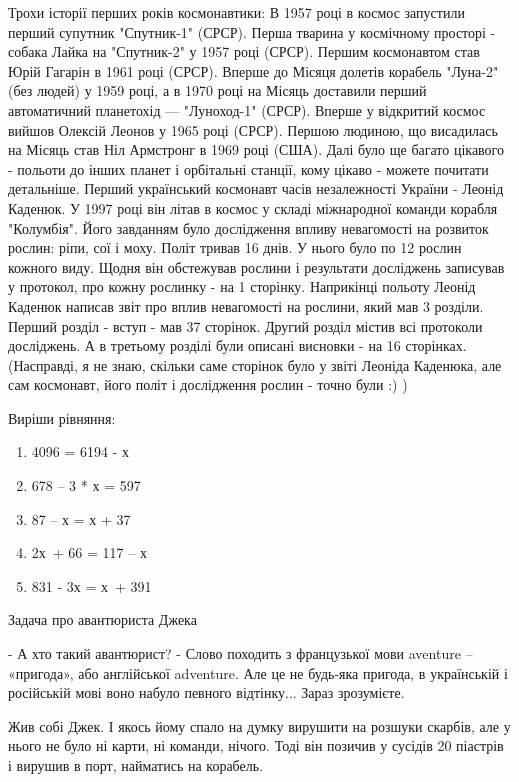 Трохи історії перших років космонавтики:
В 1957 році в космос запустили перший супутник "Спутник-1" (СРСР).
Перша тварина у космічному просторі - собака Лайка на "Спутник-2"
у 1957 році (СРСР).
Першим космонавтом став Юрій Гагарін в 1961 році (СРСР).
Вперше до Місяця долетів корабель "Луна-2" (без людей) у 1959 році,
а в 1970 році на Місяць доставили перший автоматичний планетохід —
"Луноход-1" (СРСР).
Вперше у відкритий космос вийшов Олексій Леонов у 1965 році (СРСР).
Першою людиною, що висадилась на Місяць став Ніл Армстронг в 1969 році (США).
Далі було ще багато цікавого - польоти до інших планет і орбітальні станції,
кому цікаво - можете почитати детальніше.
Перший український космонавт часів незалежності України - Леонід Каденюк.
У 1997 році він літав в космос у складі міжнародної команди корабля "Колумбія".
Його завданням було дослідження впливу невагомості на розвиток рослин:
ріпи, сої і моху. Політ тривав 16 днів. У нього було по 12 рослин кожного виду.
Щодня він обстежував рослини і результати досліджень записував у протокол,
про кожну рослинку - на 1 сторінку. Наприкінці польоту Леонід Каденюк
написав звіт про вплив невагомості на рослини, який мав 3 розділи.
Перший розділ - вступ - мав 37 сторінок. Другий розділ містив всі
протоколи досліджень. А в третьому розділі були описані висновки -
на 16 сторінках.
(Насправді, я не знаю, скільки саме сторінок було у звіті Леоніда Каденюка,
але сам космонавт, його політ і дослідження рослин - точно були :) )


\problem
Виріши рівняння:
\begin{multicols}{2}
    \begin{enumerate}
        \item 4096 = 6194 - х
        \item 678 – 3 * х = 597
        \item 87 – х = х + 37
        \item 2х + 66 = 117 – х
        \item 831 - 3х = х + 391
    \end{enumerate}
\end{multicols}


\problem
Задача про авантюриста Джека

- А хто такий авантюрист?
- Слово походить з французької мови aventure – «пригода»,
або англійської adventure. Але це не будь-яка пригода,
в українській і російській мові воно набуло певного відтінку...
Зараз зрозумієте.

Жив собі Джек. І якось йому спало на думку вирушити на розшуки скарбів,
але у нього не було ні карти, ні команди, нічого. Тоді він позичив
у сусідів 20 піастрів і вирушив в порт, найматись на корабель.

